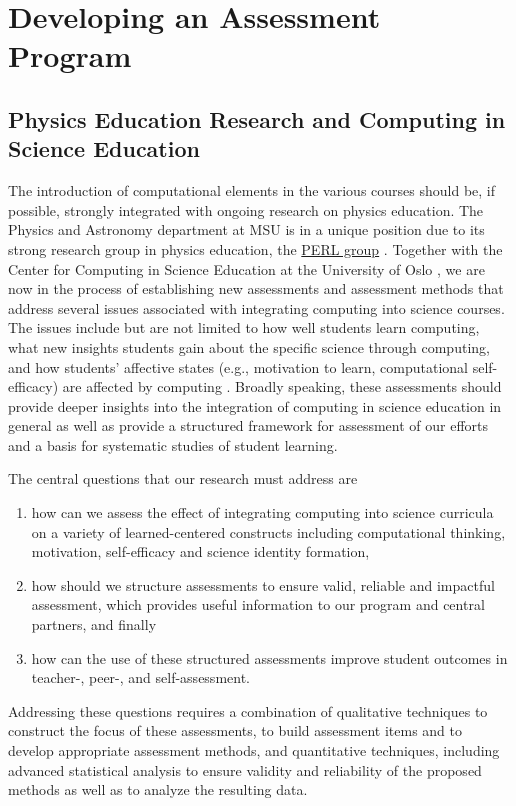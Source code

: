 \chapter{Developing an Assessment Program}

\section{Physics Education Research and Computing in Science Education}
The introduction of computational elements in the various courses should be, if possible,  strongly integrated with ongoing research on physics education.
The Physics and Astronomy department at MSU is in a unique position due to its strong research group in physics education, the \href{{http://www.pa.msu.edu/research/physics-education-lab}}{PERL group} \cite{PERLMSU}. Together with the Center for Computing in Science Education at the University of Oslo \cite{CCSEUiO}, we are now in the process
of establishing new assessments
and assessment methods that address several issues associated with
integrating computing into science courses. The issues include but
are not limited to how well students learn computing, what new
insights students gain about the specific science through computing,
and how students' affective states (e.g., motivation to learn,
computational self-efficacy) are affected by computing . Broadly
speaking, these assessments should provide deeper insights into the
integration of computing  in science education in general as well as
provide a structured framework for assessment of our efforts and a
basis for systematic studies of student learning.

The central questions that our research must address are
\begin{enumerate}
\item how can we assess the effect of integrating computing  into science curricula on a variety of learned-centered constructs including computational thinking, motivation, self-efficacy and science identity formation,
\item how should we structure assessments to ensure valid, reliable and impactful assessment, which provides useful information to our program and central partners, and finally
\item how can the use of these structured assessments improve student outcomes in teacher-, peer-, and self-assessment.
\end{enumerate}


Addressing these questions requires a combination of qualitative
techniques to construct the focus of these assessments, to build
assessment items and to develop appropriate assessment methods, and
quantitative techniques, including advanced statistical analysis to
ensure validity and reliability of the proposed methods as well as to
analyze the resulting data.

